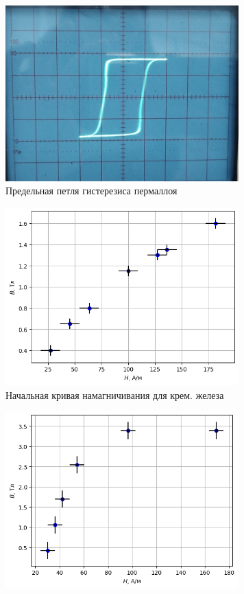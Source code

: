 \begin{figure}[h!]
    \begin{subfigure}[b]{0.5\linewidth}
        \centering
        \includegraphics[width=9cm]{images/permalloy.jpg}
        \caption{Предельная петля гистерезиса пермаллоя}
    \end{subfigure}
    \hfill
    \begin{subfigure}[b]{0.45\linewidth}
        \centering
        \includegraphics[width=9cm]{images/plot1.png}
        \caption{Начальная кривая намагничивания для крем. железа}
    \end{subfigure}
    \vfill
    \begin{subfigure}[b]{0.5\linewidth}
        \centering
        \includegraphics[width=9cm]{images/plot2}

\end{subfigure}
\end{figure}
